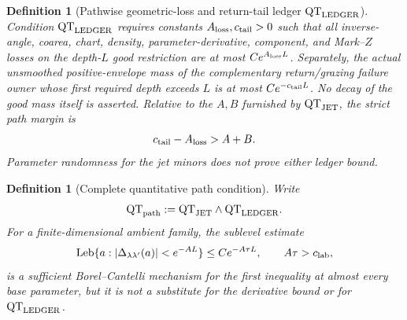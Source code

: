 \documentclass[11pt]{article}
\newtheorem{definition}[theorem]{Definition}
\begin{document}
\begin{definition}[Pathwise geometric-loss and return-tail ledger
$\mathrm{QT}_{\rm LEDGER}$]
\label{def:quantitative-path-ledger}
Condition $\mathrm{QT}_{\rm LEDGER}$ requires constants
$A_{\rm loss},c_{\rm tail}>0$ such that all inverse-angle, coarea, chart,
density, parameter-derivative, component, and Mark--$Z$ losses on the
depth-$L$ good restriction are at most $Ce^{A_{\rm loss}L}$.  Separately,
the actual unsmoothed positive-envelope mass of the complementary
return/grazing failure owner whose first required depth exceeds $L$ is at
most $Ce^{-c_{\rm tail}L}$.  No decay of the good mass itself is asserted.
Relative to the $A,B$ furnished by
$\mathrm{QT}_{\rm JET}$, the strict path margin is
\begin{equation}
\label{eq:strict-jet-tail-margin}
 c_{\rm tail}-A_{\rm loss}>A+B.
\end{equation}
Parameter randomness for the jet minors does not prove either ledger bound.
\end{definition}

\begin{definition}[Complete quantitative path condition]
\label{def:complete-QT-path}
Write
\[
 \mathrm{QT}_{\rm path}:=\mathrm{QT}_{\rm JET}
 \wedge\mathrm{QT}_{\rm LEDGER}.
\]
For a finite-dimensional ambient family, the sublevel estimate
\[
 \operatorname{Leb}\{a:|\Delta_{\lambda\lambda'}(a)|<e^{-AL}\}
 \le Ce^{-A\tau L},\qquad A\tau>c_{\rm lab},
\]
is a sufficient Borel--Cantelli mechanism for the first inequality at almost
every base parameter, but it is not a substitute for the derivative bound or
for $\mathrm{QT}_{\rm LEDGER}$.
\end{definition}
\end{document}
